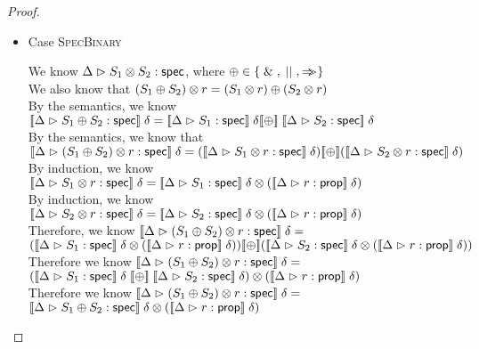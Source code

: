 \begin{proof}
\begin{itemize}
    \item Case \textsc{SpecBinary}
      \begin{tabbedproof}
        \oo We know ${\Delta} \vartriangleright {S_1 \otimes S_2} : \mathsf{spec}$, where $\oplus \in \{{\;\&\;, \;||\;, \Rightarrow\!\!\!>}\}$ \\
        \oo We also know that ${(S_1 \oplus S_2)} \otimes {r} = ({S_1} \otimes {r}) \oplus ({S_2} \otimes {r})$ \\
        \oo By the semantics, we know \\
        \oox $\interp{\judgeS{S_1 \oplus S_2}}\;\delta = \interp{\judgeS{S_1}}\;\delta \interp{\oplus} \; \interp{\judgeS{S_2}}\;\delta$ \\
        \oo By the semantics, we know that \\
        \oox $\interp{\judgeS{\Frame{(S_1 \oplus S_2)}{r}}}\;\delta = 
                                            (\interp{\judgeS{\Frame{S_1}{r}}}\;\delta) \interp{\oplus}
                                            (\interp{\judgeS{\Frame{S_2}{r}}}\;\delta)$ \\
        \oo By induction, we know $[\![{{\Delta} \vartriangleright {{S_1} \otimes {r}} : \mathsf{spec}}]\!]\;\delta = 
                                   {[\![{{\Delta} \vartriangleright {S_1} : \mathsf{spec}}]\!]\;\delta} \otimes {([\![{{\Delta} \vartriangleright {r} : {\mathsf{prop}}}]\!]\;\delta)}$ \\
        \oo By induction, we know $[\![{{\Delta} \vartriangleright {{S_2} \otimes {r}} : \mathsf{spec}}]\!]\;\delta = 
                                   {[\![{{\Delta} \vartriangleright {S_2} : \mathsf{spec}}]\!]\;\delta} \otimes {([\![{{\Delta} \vartriangleright {r} : {\mathsf{prop}}}]\!]\;\delta)}$ \\

        \oo Therefore, we know $[\![{{\Delta} \vartriangleright {{(S_1 \oplus S_2)} \otimes {r}} : \mathsf{spec}}]\!]\;\delta = $ \\
        \oox                   $(\Frame{\interp{\judgeS{S_1}}\;\delta}{(\interp{\judgeA{r}{\assert}}\;\delta)}) 
                                 \interp{\oplus} 
                                (\Frame{\interp{\judgeS{S_2}}\;\delta}{(\interp{\judgeA{r}{\assert}}\;\delta)})$ \\
        \oo Therefore we know $[\![{{\Delta} \vartriangleright {{(S_1 \oplus S_2)} \otimes {r}} : \mathsf{spec}}]\!]\;\delta = $ \\
        \oox $\Frame{(\interp{\judgeS{S_1}}\;\delta \;\interp{\oplus}\; \interp{\judgeS{S_2}}\;\delta)}
                    {(\interp{\judgeA{r}{\assert}}\;\delta)}$ \\
        \oo Therefore we know $[\![{{\Delta} \vartriangleright {{(S_1 \oplus S_2)} \otimes {r}} : \mathsf{spec}}]\!]\;\delta = $ \\
        \oox ${[\![{{\Delta} \vartriangleright {S_1 \oplus S_2} : \mathsf{spec}}]\!]\;\delta} \otimes {([\![{{\Delta} \vartriangleright {r} : {\mathsf{prop}}}]\!]\;\delta)}$ \\
      \end{tabbedproof}


\end{itemize}
\end{proof}
